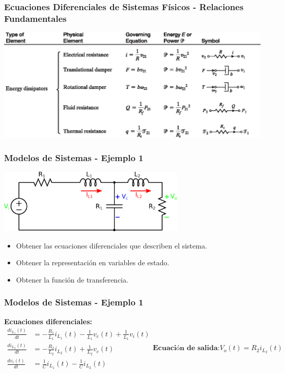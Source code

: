 \documentclass[aspectratio=169,handout]{beamer}
\theoremstyle{definition}
\theoremstyle{plain}
\theoremstyle{remark}
\begin{document}
\begin{frame}[<+->]\frametitle{Ecuaciones Diferenciales de Sistemas Físicos - Relaciones Fundamentales}
\centering
\includegraphics[width=14cm]{images/disipation.eps}
\end{frame}

\begin{frame}[<+->]\frametitle{Modelos de Sistemas - Ejemplo 1}
\centering
\includegraphics[width=9cm]{images/circuit1.eps}
\begin{itemize}
  \item Obtener las ecuaciones diferenciales que describen el sistema.
  \item Obtener la representación en variables de estado.
  \item Obtener la función de transferencia.
\end{itemize}
\end{frame}

\begin{frame}[<+->]\frametitle{Modelos de Sistemas - Ejemplo 1}
\textbf{Ecuaciones diferenciales:}
\begin{subequations}\label{eq:diff_eqs}
\begin{align}
  \frac{di_{L_1}(t)}{dt} &= -\frac{R_1}{L_1}i_{L_1}(t) - \frac{1}{L_1} v_c(t) + \frac{1}{L_1} v_i(t) \\
  \frac{di_{L_2}(t)}{dt} &= -\frac{R_2}{L_2}i_{L_2}(t) + \frac{1}{L_2} v_c(t) \\
  \frac{dv_c(t)}{dt} &= \frac{1}{C}i_{L_1}(t) - \frac{1}{C}i_{L_2}(t)
\end{align}
\textbf{Ecuación de salida:}
\begin{equation}
  V_o(t) = R_2 i_{L_2}(t)
\end{equation}
\end{subequations}
\end{frame}
\end{document}

